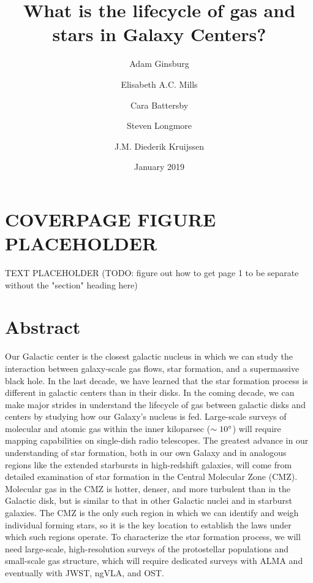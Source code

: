\documentclass[modern]{aastex62}
\begin{document}
\author{Adam Ginsburg}
\author{Elisabeth A.C. Mills}
\author{Cara Battersby}
\author{Steven Longmore}
\author{J.M. Diederik Kruijssen}

\title{What is the lifecycle of gas and stars in Galaxy Centers?}
\date{January 2019}

\section{COVERPAGE FIGURE PLACEHOLDER}
TEXT PLACEHOLDER
(TODO: figure out how to get page 1 to be separate without the "section" heading here)

\clearpage
\newpage



\section{Abstract}
Our Galactic center is the closest galactic nucleus in which we can study the
interaction between galaxy-scale gas flows, star formation, and a supermassive
black hole.  In the last decade, we have learned that the star formation
process is different in galactic centers than in their disks.  In
the coming decade, we can make major strides in understand the lifecycle
of gas between galactic disks and centers by studying how our Galaxy's
nucleus is fed.  Large-scale surveys of molecular and atomic gas within
the inner kiloparsec ($\sim10^{\circ}$) will require mapping capabilities
on single-dish radio telescopes.
The greatest advance in our understanding of star formation, both in our
own Galaxy and in analogous regions like the extended starbursts in high-redshift galaxies,
will come from detailed examination of star formation in the Central Molecular Zone (CMZ).
Molecular gas in the CMZ is hotter, denser, and more turbulent than in the Galactic disk,
but is similar to that in other Galactic nuclei and in starburst galaxies.
The CMZ is the only such region in which we can identify and weigh individual
forming stars, so it is the key location to establish the laws under which such
regions operate.  To characterize the star formation process, we will need large-scale,
high-resolution surveys of the protostellar populations and small-scale gas structure,
which will require dedicated surveys with ALMA and eventually with JWST, ngVLA, and OST.
\end{document}
